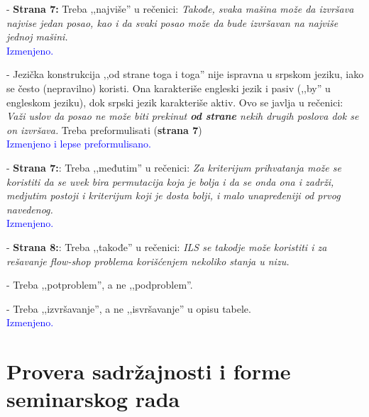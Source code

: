 \documentclass[a4paper]{report}
\newcommand{\odgovor}[1]{\textcolor{blue}{#1}}
\begin{document}
- \textbf{Strana 7:} Treba ,,najviše'' u rečenici: {\em Takođe, svaka mašina može da izvršava najvise jedan posao, kao i da svaki posao može da bude izvršavan na najviše jednoj mašini.}\\
\odgovor{Izmenjeno.\\}

- Jezička konstrukcija ,,od strane toga i toga'' nije ispravna u srpskom jeziku, iako se često (nepravilno) koristi. Ona karakteriše engleski jezik i pasiv (,,by'' u engleskom jeziku), dok srpski jezik karakteriše aktiv.
Ovo se javlja u rečenici: {\em Važi uslov da posao ne može biti prekinut \textbf{od strane} nekih drugih poslova dok se on izvršava.} Treba preformulisati (\textbf{strana 7})\\
\odgovor{Izmenjeno i lepse preformulisano.\\}

- \textbf{Strana 7:}: Treba ,,međutim'' u rečenici: {\em Za kriterijum prihvatanja može se koristiti da se uvek bira permutacija koja je bolja i da se onda ona i zadrži, medjutim postoji i kriterijum koji je dosta bolji, i malo unapređeniji od prvog navedenog.}\\
\odgovor{Izmenjeno.\\}

- \textbf{Strana 8:}: Treba ,,takođe'' u rečenici: {\em ILS se takodje može koristiti i za rešavanje flow-shop problema korišćenjem nekoliko stanja u nizu.}

- Treba ,,potproblem'', a ne ,,podproblem''.

- Treba ,,izvršavanje'', a ne ,,isvršavanje'' u opisu tabele.\\
\odgovor{Izmenjeno.\\}

\section{Provera sadržajnosti i forme seminarskog rada}
\end{document}
